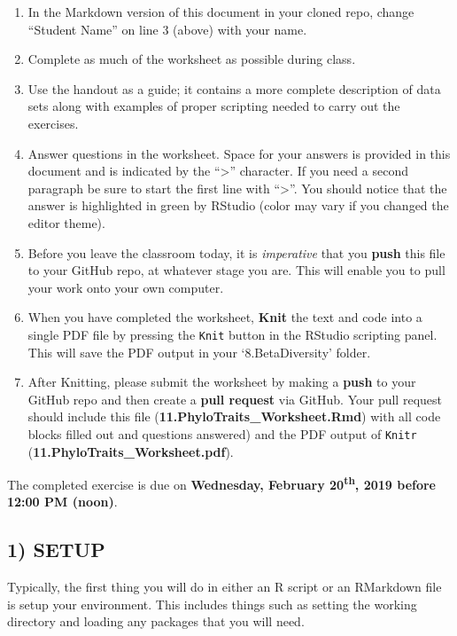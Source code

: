 \documentclass[]{article}
\providecommand{\tightlist}{%
  \setlength{\itemsep}{0pt}\setlength{\parskip}{0pt}}
\begin{document}
\begin{enumerate}
\def\labelenumi{\arabic{enumi}.}
\tightlist
\item
  In the Markdown version of this document in your cloned repo, change
  ``Student Name'' on line 3 (above) with your name.
\item
  Complete as much of the worksheet as possible during class.
\item
  Use the handout as a guide; it contains a more complete description of
  data sets along with examples of proper scripting needed to carry out
  the exercises.
\item
  Answer questions in the worksheet. Space for your answers is provided
  in this document and is indicated by the ``\textgreater{}'' character.
  If you need a second paragraph be sure to start the first line with
  ``\textgreater{}''. You should notice that the answer is highlighted
  in green by RStudio (color may vary if you changed the editor theme).
\item
  Before you leave the classroom today, it is \emph{imperative} that you
  \textbf{push} this file to your GitHub repo, at whatever stage you
  are. This will enable you to pull your work onto your own computer.
\item
  When you have completed the worksheet, \textbf{Knit} the text and code
  into a single PDF file by pressing the \texttt{Knit} button in the
  RStudio scripting panel. This will save the PDF output in your
  `8.BetaDiversity' folder.
\item
  After Knitting, please submit the worksheet by making a \textbf{push}
  to your GitHub repo and then create a \textbf{pull request} via
  GitHub. Your pull request should include this file
  (\textbf{11.PhyloTraits\_Worksheet.Rmd}) with all code blocks filled
  out and questions answered) and the PDF output of \texttt{Knitr}
  (\textbf{11.PhyloTraits\_Worksheet.pdf}).
\end{enumerate}

The completed exercise is due on \textbf{Wednesday, February
20\textsuperscript{th}, 2019 before 12:00 PM (noon)}.

\subsection{1) SETUP}\label{setup}

Typically, the first thing you will do in either an R script or an
RMarkdown file is setup your environment. This includes things such as
setting the working directory and loading any packages that you will
need.
\end{document}
